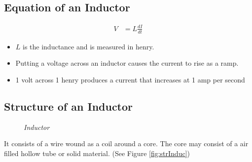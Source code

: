 		\subsection{Equation of an Inductor}
			\begin{align*}
				V &= L \frac{dI}{dt}
			\end{align*}
			\begin{itemize}
				\tightlist
				\item $L$ is the inductance and is measured in henry.
				\item Putting a voltage across an inductor causes the current to rise as a ramp.
				\item 1 volt across 1 henry produces a current that increases at 1 amp per second
			\end{itemize}
		
		\subsection{Structure of an Inductor}
			\begin{figure}[ht]
				\centering 
				\hfill
				\caption{\textit{Inductor}}
			\end{figure}
		
			It consists of a wire wound as a coil around a core. The core may consist of a air filled hollow tube or solid material. (See Figure \ref{fig:strInduc})
		
